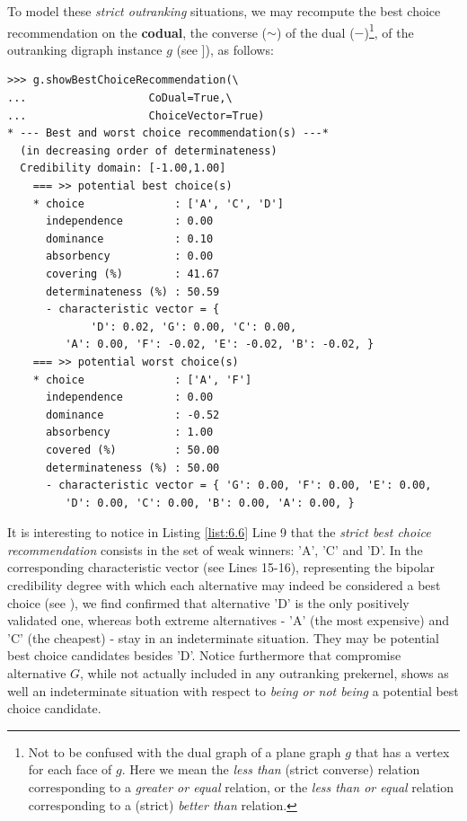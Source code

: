 To model these \emph{strict outranking} situations, we may recompute the best choice recommendation on the \textbf{codual}, the converse ($\sim$) of the dual ($-$)\footnote{Not to be confused with the dual graph of a plane graph $g$ that has a vertex for each face of $g$. Here we mean the \emph{less than} (strict converse) relation corresponding to a \emph{greater or equal} relation, or the \emph{less than or equal} relation corresponding to a (strict) \emph{better than} relation.}, of the outranking digraph instance $g$ (see \citet{BIS-2013}]), as follows:
\begin{lstlisting}[caption={Computing the strict best choice recommendation},label=list:6.6]
>>> g.showBestChoiceRecommendation(\
...                   CoDual=True,\
...                   ChoiceVector=True)   
* --- Best and worst choice recommendation(s) ---*
  (in decreasing order of determinateness)   
  Credibility domain: [-1.00,1.00]
    === >> potential best choice(s)
    * choice              : ['A', 'C', 'D']
      independence        : 0.00
      dominance           : 0.10
      absorbency          : 0.00
      covering (%)        : 41.67
      determinateness (%) : 50.59
      - characteristic vector = {
             'D': 0.02, 'G': 0.00, 'C': 0.00,
	     'A': 0.00, 'F': -0.02, 'E': -0.02, 'B': -0.02, }
    === >> potential worst choice(s) 
    * choice              : ['A', 'F']
      independence        : 0.00
      dominance           : -0.52
      absorbency          : 1.00
      covered (%)         : 50.00
      determinateness (%) : 50.00
      - characteristic vector = { 'G': 0.00, 'F': 0.00, 'E': 0.00,
	     'D': 0.00, 'C': 0.00, 'B': 0.00, 'A': 0.00, }
\end{lstlisting}				  

It is interesting to notice in Listing \ref{list:6.6} Line 9 that the \emph{strict best choice recommendation} consists in the set of weak \Condorcet winners: 'A', 'C' and 'D'. In the corresponding characteristic vector (see Lines 15-16), representing the bipolar credibility degree with which each alternative may indeed be considered a best choice (see \citet{BIS-2006a,BIS-2006b}), we find confirmed that alternative 'D' is the only positively validated one, whereas both extreme alternatives - 'A' (the most expensive) and 'C' (the cheapest) - stay in an indeterminate situation. They may be potential best choice candidates besides 'D'. Notice furthermore that compromise alternative $G$, while not actually included in any outranking prekernel, shows as well an indeterminate situation with respect to \emph{being or not being} a potential best choice candidate. 

